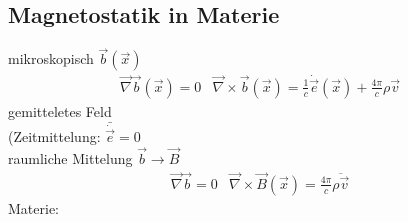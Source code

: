 \documentclass[a4paper]{article}
\begin{document}
\subsection{Magnetostatik in Materie}
mikroskopisch $\vec{b}(\vec{x})$\\
\begin{align}
\vec{\nabla}\vec{b}(\vec{x})=0 & \vec{\nabla}\times\vec{b}(\vec{x})=\frac{1}{c}
\dot{\vec{e}}(\vec{x})+\frac{4\pi}{c}\rho\vec{v}
\end{align}
gemitteletes Feld\\
(Zeitmittelung: $\bar{\dot{\vec{e}}}=0$\\
raumliche Mittelung $\vec{b}\rightarrow\vec{B}$\\
\begin{align}
\vec{\nabla}\vec{b}=0 & \vec{\nabla}\times\vec{B}(\vec{x})=\frac{4\pi}{c}\overline{\rho\vec{v}}
\end{align}
Materie:
\end{document}
